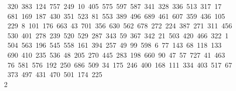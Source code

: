 \begin{tabbing}
\ 320\ 383\ 124\ 757\ 249\ 10\ 405\ 575\ 597\ 587\ 341\ 328\ 336\ 513\ 317\ 17\\[0pt]
\ 681\ 169\ 187\ 430\ 351\ 523\ 81\ 553\ 389\ 496\ 689\ 461\ 607\ 359\ 436\ 105\\[0pt]
\>\ 229\ 8\ 101\ 176\ 663\ 43\ 701\ 356\ 630\ 562\ 678\ 272\ 224\ 387\ 271\ 311\ 456\\[0pt]
\>\ 530\ 401\ 278\ 239\ 520\ 529\ 287\ 343\ 59\ 367\ 342\ 21\ 503\ 420\ 466\ 322\ 1\\[0pt]
\ 504\ 563\ 196\ 545\ 558\ 161\ 394\ 257\ 49\ 99\ 598\ 6\ 77\ 143\ 68\ 118\ 133\\[0pt]
\>\ 690\ 410\ 235\ 536\ 48\ 205\ 270\ 445\ 283\ 198\ 660\ 90\ 47\ 57\ 727\ 41\ 463\\[0pt]
\>\ 76\ 581\ 576\ 192\ 250\ 686\ 509\ 34\ 175\ 246\ 400\ 168\ 111\ 334\ 403\ 517\ 67\\[0pt]
\ 373\ 497\ 431\ 470\ 501\ 174\ 225\\[0pt]
2\>\end{tabbing}
